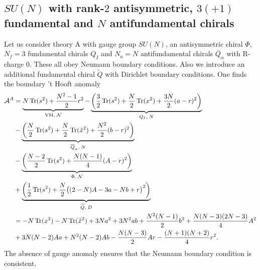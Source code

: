 \documentclass[12pt]{article}
\newcommand{\Acal}{\mathcal{A}}
\newcommand{\Ncal}{\mathcal{N}}
\DeclareMathOperator*{\Tr}{{\rm Tr}}
\numberwithin{equation}{section}
\begin{document}
\subsection{$SU(N)$ with rank-$2$ antisymmetric, $3(+1)$ fundamental and $N$ antifundamental chirals}
\label{sec_GR_integral_AS}
Let us consider theory A with gauge group $SU(N)$, an antisymmetric chiral $\Phi$, $N_f = 3$
fundamental chirals $Q_{I}$ and $N_a = N$ antifundamental chirals $\overline{Q}_{\alpha}$ with R-charge $0$. 
These all obey Neumann boundary conditions. 
Also we introduce an additional fundamental chiral $\widetilde{Q}$ with Dirichlet boundary conditions.  
One finds the boundary 't Hooft anomaly 
\begin{align}
\label{bdy_SUN_AS_3_N_anomA}
\Acal^A & = \underbrace{N\Tr(s^2) + \frac{N^2 - 1}{2}r^2}_{\textrm{VM}, \; \Ncal}
 - \underbrace{\left( \frac{3}{2}\Tr(s^2) + \frac{N}{2}\Tr(x^2) + \frac{3N}{2}(a-r)^2 \right)}_{Q_I, \; N}
  \nonumber \\
 & - \underbrace{\left( \frac{N}{2}\Tr(s^2) + \frac{N}{2}\Tr(\tilde{x}^2) + \frac{N^2}{2}(b-r)^2 \right)}_{\overline{Q}_{\alpha}, \; N}
  \nonumber \\
 & - \underbrace{\left( \frac{N-2}{2}\Tr(s^2) + \frac{N(N-1)}{4}(A - r)^2 \right)}_{\Phi, \; \Ncal}
 \nonumber\\
 & + \underbrace{\left( \frac{1}{2}\Tr(s^2) + \frac{N}{2}\big( (2 - N)A - 3a - Nb + r \big)^2 \right)}_{\widetilde{Q}, \; D}
 \nonumber\\
 &=- N \Tr(x^2) - N \Tr(\tilde{x}^2) + 3Na^2 + 3N^2 ab + \frac{N^2(N-1)}{2}b^2 + \frac{N(N-3)(2N-3)}{4}A^2
  \nonumber \\
  & + 3N(N-2)Aa + N^2(N-2)Ab - \frac{N(N-3)}{2}Ar - \frac{(N+1)(N+2)}{4}r^2.
\end{align}
The absence of gauge anomaly ensures that the Neumann boundary condition is consistent. 
\end{document}
